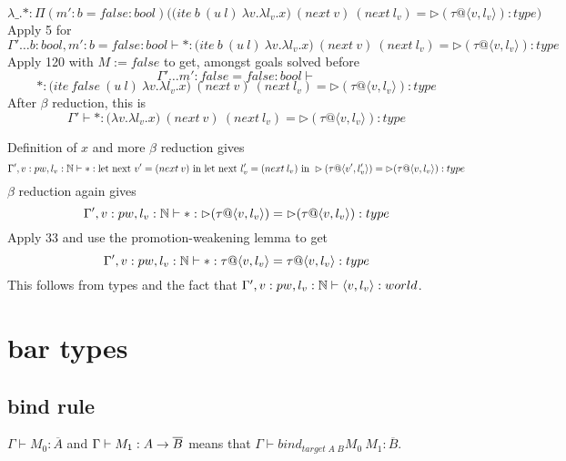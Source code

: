 \documentclass{article}
\begin{document}
\begin{itemize}
\begin{itemize}
\begin{itemize}
\begin{itemize}
\[  \lambda \_.* :\Pi(m' : b = false : bool)\Big(\big( ite \: b \: (u \: l) \: \lambda v. \lambda l_v. x \big) \:  (next \:v) \: (next \: l_v) = \rhd (\tau @ \langle v, l_v \rangle) : type \Big)
  \]
  Apply 5 for 
   \[\Gamma' \dots b: bool, m' : b = false : bool \vdash
* :\big( ite \: b \: (u \: l) \: \lambda v. \lambda l_v. x \big) \:  (next \:v) \: (next \: l_v) = \rhd (\tau @ \langle v, l_v \rangle) : type
  \]
  Apply 120 with $M:= false$ to get, amongst goals solved before 
     \[\Gamma' \dots m' : false = false : bool \vdash\]
\[* :\big( ite \: false \: (u \: l) \: \lambda v. \lambda l_v. x \big) \:  (next \:v) \: (next \: l_v) = \rhd (\tau @ \langle v, l_v \rangle) : type
  \]
  After $\beta$ reduction, this is 
  \[\Gamma'  \vdash
* : \big( \lambda v. \lambda l_v. x \big) \:  (next \:v) \: (next \: l_v) = \rhd (\tau @ \langle v, l_v \rangle) : type
  \]
     \end{itemize}

Definition of $x$ and more $\beta$ reduction gives
\[\Gamma', v: pw, l_v: \mathbb{N} \vdash   *
:  \text{let next }v' = (next \: v) \text{ in let next } l_v' = (next \: l_v) \text{ in } \rhd(\tau @ \langle v', l_v' \rangle)
= \rhd (\tau @ \langle v, l_v \rangle) : type
\]
$\beta$ reduction again gives 
\[\Gamma', v: pw, l_v: \mathbb{N} \vdash   *
:  \rhd(\tau @ \langle v, l_v \rangle)
= \rhd (\tau @ \langle v, l_v \rangle) : type
\]
Apply 33 and use the promotion-weakening lemma to get 
\[\Gamma', v: pw, l_v: \mathbb{N} \vdash   *
:  \tau @ \langle v, l_v \rangle
= \tau @ \langle v, l_v \rangle : type
\]
This follows from types and the fact that $\Gamma', v: pw, l_v: \mathbb{N} \vdash \langle v, l_v \rangle : world$.
\end{itemize}


\end{itemize}
\end{itemize}





 

\section*{bar types}

\subsection*{bind rule }
$\Gamma \vdash M_0 : \overline{A}$ and $\Gamma \vdash M_1 : A \rightarrow \overline{B}$ means that $\Gamma \vdash bind_{target\; A \; B} M_0 \: M_1 : \overline{B}$. 
\end{document}
